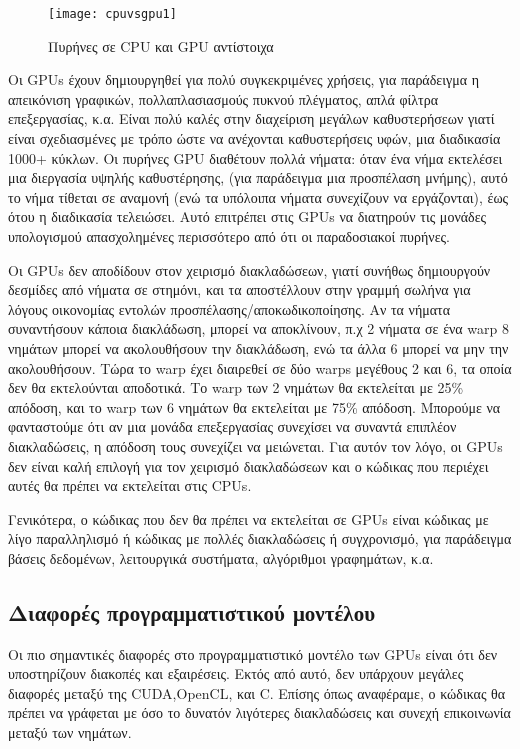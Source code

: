 \begin{figure}[h]
\centering
\texttt{[image: cpuvsgpu1]}
\caption{Πυρήνες σε CPU και GPU αντίστοιχα\cite{figure-1}}
\end{figure}

Οι GPUs έχουν δημιουργηθεί για πολύ συγκεκριμένες χρήσεις, για παράδειγμα η απεικόνιση γραφικών, πολλαπλασιασμούς πυκνού πλέγματος, απλά φίλτρα επεξεργασίας, κ.α. Είναι πολύ καλές στην διαχείριση μεγάλων καθυστερήσεων γιατί είναι σχεδιασμένες με τρόπο ώστε να ανέχονται καθυστερήσεις υφών, μια διαδικασία 1000+ κύκλων. Οι πυρήνες GPU διαθέτουν πολλά νήματα: όταν ένα νήμα εκτελέσει μια διεργασία υψηλής καθυστέρησης, (για παράδειγμα μια προσπέλαση μνήμης), αυτό το νήμα τίθεται σε αναμονή (ενώ τα υπόλοιπα νήματα συνεχίζουν να εργάζονται), έως ότου η διαδικασία τελειώσει. Αυτό επιτρέπει στις GPUs να διατηρούν τις μονάδες υπολογισμού απασχολημένες περισσότερο από ότι οι παραδοσιακοί πυρήνες.

Οι GPUs δεν αποδίδουν στον χειρισμό διακλαδώσεων, γιατί συνήθως δημιουργούν δεσμίδες από νήματα σε στημόνι, και τα αποστέλλουν στην γραμμή σωλήνα για λόγους οικονομίας εντολών προσπέλασης/αποκωδικοποίησης. Αν τα νήματα συναντήσουν κάποια διακλάδωση, μπορεί να αποκλίνουν, π.χ 2 νήματα σε ένα warp 8 νημάτων μπορεί να ακολουθήσουν την διακλάδωση, ενώ τα άλλα 6 μπορεί να μην την ακολουθήσουν. Τώρα το warp έχει διαιρεθεί σε δύο warps μεγέθους 2 και 6, τα οποία δεν θα εκτελούνται αποδοτικά. Το warp των 2 νημάτων θα εκτελείται με 25\% απόδοση, και το warp των 6 νημάτων θα εκτελείται με 75\% απόδοση. Μπορούμε να φανταστούμε ότι αν μια μονάδα επεξεργασίας συνεχίσει να συναντά επιπλέον διακλαδώσεις, η απόδοση τους συνεχίζει να μειώνεται. Για αυτόν τον λόγο, οι GPUs δεν είναι καλή επιλογή για τον χειρισμό διακλαδώσεων και ο κώδικας που περιέχει αυτές θα πρέπει να εκτελείται στις CPUs.

Γενικότερα, ο κώδικας που δεν θα πρέπει να εκτελείται σε GPUs είναι κώδικας με λίγο παραλληλισμό ή κώδικας με πολλές διακλαδώσεις ή συγχρονισμό, για παράδειγμα βάσεις δεδομένων, λειτουργικά συστήματα, αλγόριθμοι γραφημάτων, κ.α.
\subsection{Διαφορές προγραμματιστικού μοντέλου}
Οι πιο σημαντικές διαφορές στο προγραμματιστικό μοντέλο των GPUs είναι ότι δεν υποστηρίζουν διακοπές και εξαιρέσεις. Εκτός από αυτό, δεν υπάρχουν μεγάλες διαφορές μεταξύ της CUDA,OpenCL, και C. Επίσης όπως αναφέραμε, ο κώδικας θα πρέπει να γράφεται με όσο το δυνατόν λιγότερες διακλαδώσεις και συνεχή επικοινωνία μεταξύ των νημάτων.

